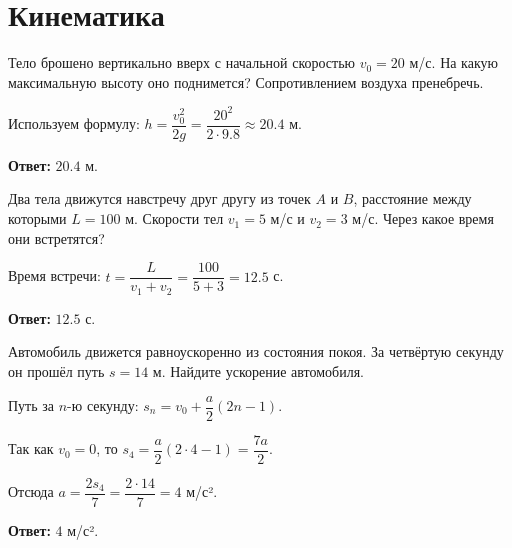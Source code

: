 \section{Кинематика}

Тело брошено вертикально вверх с начальной скоростью $v_0 = 20$ м/с. 
На какую максимальную высоту оно поднимется? Сопротивлением воздуха пренебречь.

\begin{solution}
Используем формулу: $h = \dfrac{v_0^2}{2g} = \dfrac{20^2}{2 \cdot 9.8} \approx 20.4$ м.

\textbf{Ответ:} $20.4$ м.
\end{solution}

Два тела движутся навстречу друг другу из точек $A$ и $B$, расстояние между которыми $L = 100$ м. 
Скорости тел $v_1 = 5$ м/с и $v_2 = 3$ м/с. Через какое время они встретятся?

\begin{solution}
Время встречи: $t = \dfrac{L}{v_1 + v_2} = \dfrac{100}{5 + 3} = 12.5$ с.

\textbf{Ответ:} $12.5$ с.
\end{solution}

Автомобиль движется равноускоренно из состояния покоя. За четвёртую секунду он прошёл путь $s = 14$ м. 
Найдите ускорение автомобиля.

\begin{solution}
Путь за $n$-ю секунду: $s_n = v_0 + \dfrac{a}{2}(2n-1)$.

Так как $v_0 = 0$, то $s_4 = \dfrac{a}{2}(2 \cdot 4 - 1) = \dfrac{7a}{2}$.

Отсюда $a = \dfrac{2s_4}{7} = \dfrac{2 \cdot 14}{7} = 4$ м/с².

\textbf{Ответ:} $4$ м/с².
\end{solution}